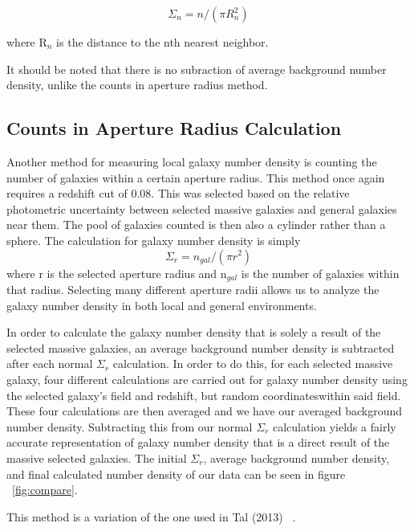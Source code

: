\documentclass[apj]{emulateapj}
\begin{document}
 $$\Sigma_{n} = n / (\pi  R_{n}^{2})$$

 where R$_{n}$ is the distance to the nth nearest neighbor. 

It should be noted that there is no subraction of average background number density, unlike the counts in aperture radius method.



\subsection{Counts in Aperture Radius Calculation}

Another method for measuring local galaxy number density is counting the number of galaxies within a certain aperture radius. This method once again requires a redshift cut of 0.08. This was selected based on the relative photometric uncertainty between selected massive galaxies and general galaxies near them. The pool of galaxies counted is then also a cylinder rather than a sphere. The calculation for galaxy number density is simply
 $$\Sigma_{r} = n_{gal} / (\pi r^{2})$$
 where r is the selected aperture radius and n$_{gal}$ is the number of galaxies within that radius. Selecting many different aperture radii allows us to analyze the galaxy number density in both local and general environments. 

In order to calculate the galaxy number density that is solely a result of the selected massive galaxies, an average background number density is subtracted after each normal $\Sigma_{r}$ calculation. In order to do this, for each selected massive galaxy, four different calculations are carried out for galaxy number density using the selected galaxy's field and redshift, but random coordinateswithin said field. These four calculations are then averaged and we have our averaged background number density. Subtracting this from our normal $\Sigma_{r}$ calculation yields a fairly accurate representation of galaxy number density that is a direct result of the massive selected galaxies. The initial $\Sigma_{r}$, average background number density, and final calculated number density of our data can be seen in figure ~\ref{fig:compare}.

This method is a variation of the one used in Tal (2013) ~\cite{2013ApJ...769...31T}.
\end{document}
